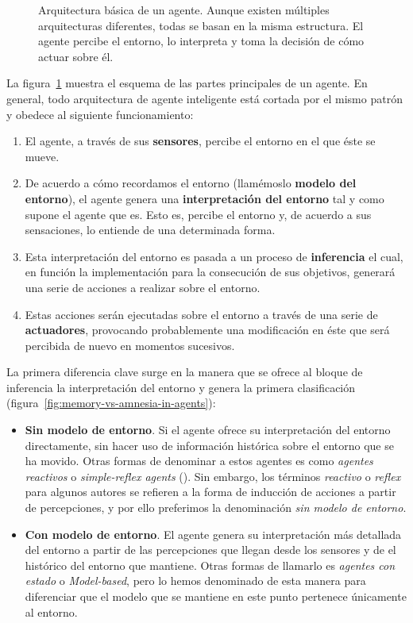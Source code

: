 \begin{figure}[!b]
	\caption[Arquitectura básica de un agente.]{Arquitectura básica de un agente. Aunque existen múltiples arquitecturas diferentes, todas se basan en la misma estructura. El agente percibe el entorno, lo interpreta y toma la decisión de cómo actuar sobre él.}
	\label{fig:agent-basic-architecture}
\end{figure}

La figura~\ref{fig:agent-basic-architecture} muestra el esquema de las partes principales de un agente. En general, todo arquitectura de agente inteligente está cortada por el mismo patrón y obedece al siguiente funcionamiento:

\begin{enumerate}
	\item El agente, a través de sus \textbf{sensores}, percibe el entorno en el que éste se mueve.
	\item De acuerdo a cómo recordamos el entorno (llamémoslo \textbf{modelo del entorno}), el agente genera una \textbf{interpretación del entorno} tal y como supone el agente que es. Esto es, percibe el entorno y, de acuerdo a sus sensaciones, lo entiende de una determinada forma.
	\item Esta interpretación del entorno es pasada a un proceso de \textbf{inferencia} el cual, en función la implementación para la consecución de sus objetivos, generará una serie de acciones a realizar sobre el entorno.
	\item Estas acciones serán ejecutadas sobre el entorno a través de una serie de \textbf{actuadores}, provocando probablemente una modificación en éste que será percibida de nuevo en momentos sucesivos.
\end{enumerate}

La primera diferencia clave surge en la manera que se ofrece al bloque de inferencia la interpretación del entorno y genera la primera clasificación (figura~\ref{fig:memory-vs-amnesia-in-agents}):

\begin{itemize}
	\item \textbf{Sin modelo de entorno}. Si el agente ofrece su interpretación del entorno directamente, sin hacer uso de información histórica sobre el entorno que se ha movido. Otras formas de denominar a estos agentes es como \textit{agentes reactivos} o \textit{simple-reflex agents} (\cite{russell2003artificial}). Sin embargo, los términos \textit{reactivo} o \textit{reflex} para algunos autores se refieren a la forma de inducción de acciones a partir de percepciones, y por ello preferimos la denominación \textit{sin modelo de entorno}.
	\item \textbf{Con modelo de entorno}. El agente genera su interpretación más detallada del entorno a partir de las percepciones que llegan desde los sensores y de el histórico del entorno que mantiene. Otras formas de llamarlo es \textit{agentes con estado} o \textit{Model-based}, pero lo hemos denominado de esta manera para diferenciar que el modelo que se mantiene en este punto pertenece únicamente al entorno.
\end{itemize}

